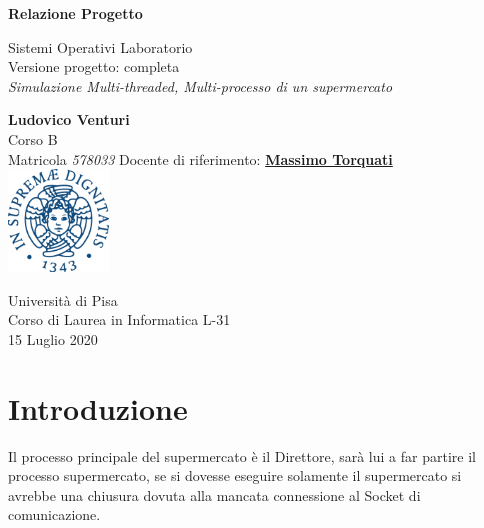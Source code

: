 \documentclass[11pt, a4paper]{article}
\begin{document}
\begin{titlepage}
    \begin{center}
        \Huge
        \textbf{Relazione Progetto}
            
        \vspace{0.5cm}
        \LARGE
        Sistemi Operativi Laboratorio\\
        \large
        \vspace{0.5cm}
        Versione progetto: completa\\
        \vspace{0.2cm}
        \textit{Simulazione Multi-threaded, Multi-processo di un supermercato}\\
        \vspace{1cm}
        \LARGE
            
        \textbf{Ludovico Venturi}\\
         \vspace{0.5cm}
         \Large
        Corso B\\
        Matricola \textit{578033}
        \small
        \tableofcontents
        \LARGE
        \vfill
        Docente di riferimento: \href{http://calvados.di.unipi.it/paragroup/torquati/}{\textbf{Massimo Torquati}}\\
        
        \vspace{1cm}            
        \includegraphics[width=0.2\textwidth]{unipi}
        \vspace{1cm}
            
        \large
		Università di Pisa\\
		Corso di Laurea in Informatica L-31 \\
        15 Luglio 2020
         \vspace{1.5cm}
            
    \end{center}
\end{titlepage}
\clearpage

\section{Introduzione}
Il processo principale del supermercato è il Direttore, sarà lui a far partire il processo supermercato, se si dovesse eseguire solamente il supermercato si avrebbe una chiusura dovuta alla mancata connessione al Socket di comunicazione.\\
\end{document}
